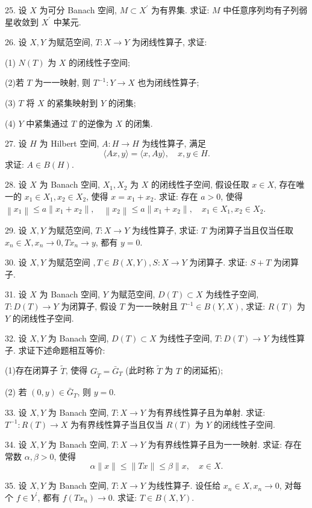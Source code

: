 \documentclass[openany]{ctexbook}
\theoremstyle{kaiti}
\theoremstyle{normal}
\begin{document}
25. 设 $X$ 为可分 Banach 空间, $M \subset X^{\prime}$ 为有界集. 求证: $M$ 中任意序列均有子列弱星收敛到 $X^{\prime}$ 中某元.

26. 设 $X, Y$ 为赋范空间, $T: X \rightarrow Y$ 为闭线性算子, 求证:

(1) $N(T)$ 为 $X$ 的闭线性子空间;

(2)若 $T$ 为一一映射, 则 $T^{-1}: Y \rightarrow X$ 也为闭线性算子;

(3) $T$ 将 $X$ 的紧集映射到 $Y$ 的闭集;

(4) $Y$ 中紧集通过 $T$ 的逆像为 $X$ 的闭集.

27. 设 $H$ 为 Hilbert 空间, $A: H \rightarrow H$ 为线性算子, 满足
$$
\langle A x, y\rangle=\langle x, A y\rangle, \quad x, y \in H.
$$
求证: $A \in B(H)$.

28. 设 $X$ 为 Banach 空间, $X_1, X_2$ 为 $X$ 的闭线性子空间, 假设任取 $x \in X$, 存在唯一的 $x_1 \in X_1, x_2 \in X_2$, 使得 $x=x_1+x_2$. 求证: 存在 $a>0$, 使得
$\left\|x_1\right\| \leqslant a\left\|x_1+x_2\right\|, \quad\left\|x_2\right\| \leqslant a\left\|x_1+x_2\right\|, \quad x_1 \in X_1, x_2 \in X_2$.

29. 设 $X, Y$ 为赋范空间, $T: X \rightarrow Y$ 为线性算子, 求证: $T$ 为闭算子当且仅当任取 $x_n \in X, x_n \rightarrow 0, T x_n \rightarrow y$, 都有 $y=0$.

30. 设 $X, Y$ 为赋范空间 $, T \in B(X, Y), S: X \rightarrow Y$ 为闭算子. 求证: $S+T$ 为闭算子.

31. 设 $X$ 为 Banach 空间, $Y$ 为赋范空间, $D(T) \subset X$ 为线性子空间, $T: D(T) \rightarrow Y$ 为闭算子, 假设 $T$ 为一一映射且 $T^{-1} \in B(Y, X)$, 求证: $R(T)$ 为 $Y$ 的闭线性子空间.

32. 设 $X, Y$ 为 Banach 空间, $D(T) \subset X$ 为线性子空间, $T: D(T) \rightarrow Y$ 为线性算子. 求证下述命题相互等价:

(1)存在闭算子 $\widetilde{T}$, 使得 $G_{\widetilde{T}}=\bar{G}_{T}$ (此时称 $\widetilde{T}$ 为 $T$ 的闭延拓);

(2) 若 $(0, y) \in \bar{G}_{T}$, 则 $y=0$.

33. 设 $X, Y$ 为 Banach 空间, $T: X \rightarrow Y$ 为有界线性算子且为单射. 求证: $T^{-1}: R(T) \rightarrow X$ 为有界线性算子当且仅当 $R(T)$ 为 $Y$ 的闭线性子空间.

34. 设 $X, Y$ 为 Banach 空间, $T: X \rightarrow Y$ 为有界线性算子且为一一映射. 求证: 存在常数 $\alpha, \beta>0$, 使得
$$
\alpha\|x\| \leqslant\|T x\| \leqslant \beta \| x, \quad x \in X.
$$

35. 设 $X, Y$ 为 Banach 空间, $T: X \rightarrow Y$ 为线性算子. 设任给 $x_n \in X, x_n \rightarrow 0$, 对每个 $f \in Y^{\prime}$, 都有 $f\left(T x_n\right) \rightarrow 0$. 求证: $T \in B(X, Y)$.
\end{document}
